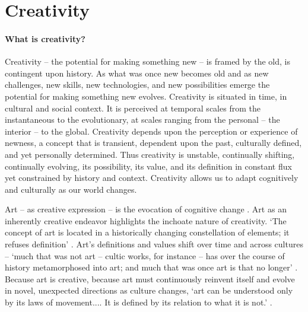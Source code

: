 \documentclass{article}
\begin{document}

\section{Creativity}

\paragraph{What is creativity?}
Creativity -- the potential for making something new -- 
is framed by the old, 
is contingent upon history.
As what was once new becomes old and 
as new challenges, new skills, new technologies, and new possibilities emerge 
the potential for making something new evolves.
%
Creativity is situated in time, in cultural and social context. 
It is perceived at temporal scales from the instantaneous to the evolutionary,
at scales ranging from the personal -- the interior -- to the global. 
%
Creativity depends upon the perception or experience of newness, 
a concept that is transient, dependent upon the past, culturally defined, and yet personally determined.
Thus creativity is unstable, continually shifting, continually evolving, 
its possibility, its value, and its definition in constant flux 
yet constrained by history and context.
Creativity allows us to adapt cognitively and culturally
as our world changes.


Art -- as creative expression -- is the evocation of cognitive change \citep{Donald2006}.
Art as an inherently creative endeavor
highlights the inchoate nature of creativity.
`The concept of art is located in a historically changing constellation of elements; it refuses definition'
\citep{Adorno1997}.
Art's definitions and values shift over time and across cultures -- 
`much that was not art -- cultic works, for instance -- has over the course of history metamorphosed into art; 
and much that was once art is that no longer'
\citep{Adorno1997}.
Because art is creative, 
because art must continuously reinvent itself and evolve in  novel, unexpected directions as culture changes, 
`art can be understood only by its laws of movement.... It is defined by its relation to what it is not.'
\citep{Adorno1997}.
%

\end{document}
